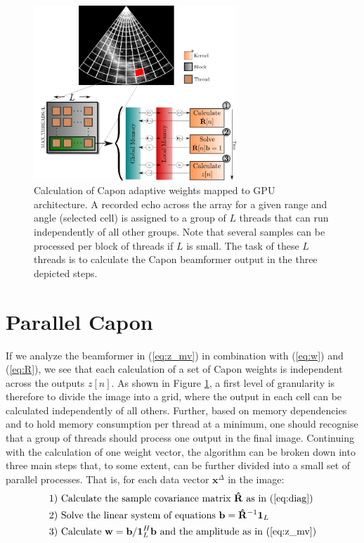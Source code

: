 \documentclass[conference]{IEEEtran}
\newcommand{\mat}[1]{\mathbf{#1}}
\renewcommand{\vec}[1]{\mathbf{#1}}
\begin{document}
\begin{figure}
\centerline{\includegraphics[width=3in]{gfx/gpu_layout_vertical_lr.png}}
\caption{Calculation of Capon adaptive weights mapped to GPU architecture. A recorded echo across the array for a given range and angle (selected cell) is assigned to a group of $L$ threads that can run independently of all other groups. Note that several samples can be processed per block of threads if $L$ is small. The task of these $L$ threads is to calculate the Capon beamformer output in the three depicted steps.}
\label{fig:gpulayout}
\end{figure}


\section{Parallel Capon}\label{sec:meth}
If we analyze the beamformer in (\ref{eq:z_mv}) in combination with (\ref{eq:w}) and (\ref{eq:R}), we see that each calculation of a set of Capon weights is independent across the outputs $z[n]$. As shown in Figure \ref{fig:gpulayout}, a first level of granularity is therefore to divide the image into a grid, where the output in each cell can be calculated independently of all others. Further, based on memory dependencies and to hold memory consumption per thread at a minimum, one should recognise that a group of threads should process one output in the final image. Continuing with the calculation of one weight vector, the algorithm can be broken down into three main steps that, to some extent, can be further divided into a small set of parallel processes. That is, for each data vector $\vec{x}^\Delta$ in the image:
\begin{align*}
\text{1) } &\text{Calculate the sample covariance matrix } \mat{\hat{R}} \text{ as in } \text{(\ref{eq:diag})}\\
\text{2) } &\text{Solve the linear system of equations } \vec{b} =\mat{\hat{R}}^{-1}\vec{1}_L\\
\text{3) } &\text{Calculate } \vec{w} = \vec{b}/\vec{1}_{L}^H\vec{b} \text{ and the amplitude as in (\ref{eq:z_mv})}
\end{align*}
\end{document}
